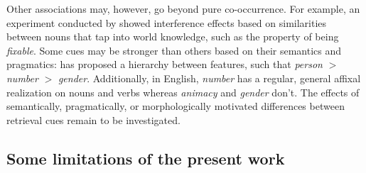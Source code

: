 \documentclass{cambridge7A}\usepackage[]{graphicx}\usepackage[]{color}
\newcommand{\revised}[1]{#1}
\begin{document}
Other associations may, however, go beyond pure co-occurrence. 
For example, an experiment conducted by \cite{VanDyke2006} showed interference effects based on similarities between nouns that tap into world knowledge, such as the property of being \emph{fixable}.
Some cues may be stronger than others based on their semantics and pragmatics: \cite{CarminatiNella2005} has proposed a hierarchy between features, such that \textit{person} $>$ \textit{number} $>$ \textit{gender}.
Additionally, in English, \textit{number} \revised{has a regular, general affixal realization on nouns and verbs whereas \textit{animacy} and \textit{gender} don't.} 
The effects of semantically, pragmatically, or morphologically motivated differences between retrieval cues remain to be investigated.


\subsection{Some limitations of the present work} \label{limitations}
\end{document}
